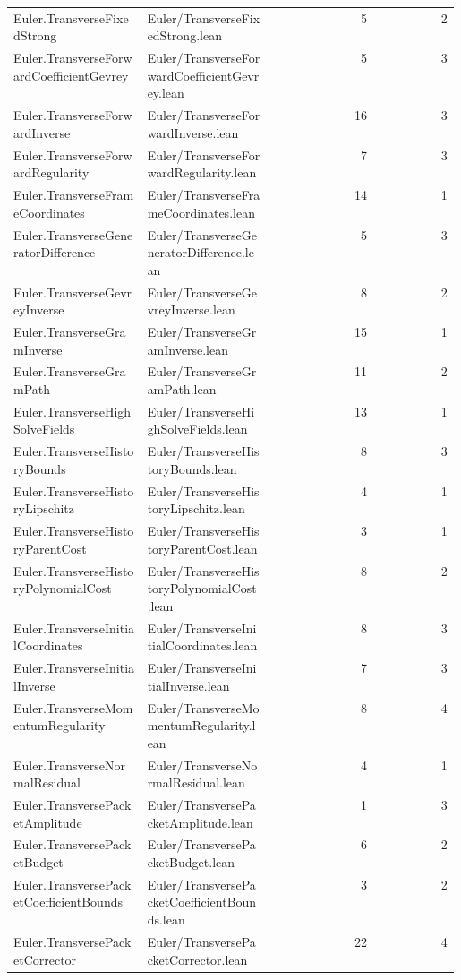 \begin{longtable}{p{0.30\linewidth}p{0.28\linewidth}rr}
Euler.TransverseFixedStrong & Euler/TransverseFixedStrong.lean & 5 & 2\\
Euler.TransverseForwardCoefficientGevrey & Euler/TransverseForwardCoefficientGevrey.lean & 5 & 3\\
Euler.TransverseForwardInverse & Euler/TransverseForwardInverse.lean & 16 & 3\\
Euler.TransverseForwardRegularity & Euler/TransverseForwardRegularity.lean & 7 & 3\\
Euler.TransverseFrameCoordinates & Euler/TransverseFrameCoordinates.lean & 14 & 1\\
Euler.TransverseGeneratorDifference & Euler/TransverseGeneratorDifference.lean & 5 & 3\\
Euler.TransverseGevreyInverse & Euler/TransverseGevreyInverse.lean & 8 & 2\\
Euler.TransverseGramInverse & Euler/TransverseGramInverse.lean & 15 & 1\\
Euler.TransverseGramPath & Euler/TransverseGramPath.lean & 11 & 2\\
Euler.TransverseHighSolveFields & Euler/TransverseHighSolveFields.lean & 13 & 1\\
Euler.TransverseHistoryBounds & Euler/TransverseHistoryBounds.lean & 8 & 3\\
Euler.TransverseHistoryLipschitz & Euler/TransverseHistoryLipschitz.lean & 4 & 1\\
Euler.TransverseHistoryParentCost & Euler/TransverseHistoryParentCost.lean & 3 & 1\\
Euler.TransverseHistoryPolynomialCost & Euler/TransverseHistoryPolynomialCost.lean & 8 & 2\\
Euler.TransverseInitialCoordinates & Euler/TransverseInitialCoordinates.lean & 8 & 3\\
Euler.TransverseInitialInverse & Euler/TransverseInitialInverse.lean & 7 & 3\\
Euler.TransverseMomentumRegularity & Euler/TransverseMomentumRegularity.lean & 8 & 4\\
Euler.TransverseNormalResidual & Euler/TransverseNormalResidual.lean & 4 & 1\\
Euler.TransversePacketAmplitude & Euler/TransversePacketAmplitude.lean & 1 & 3\\
Euler.TransversePacketBudget & Euler/TransversePacketBudget.lean & 6 & 2\\
Euler.TransversePacketCoefficientBounds & Euler/TransversePacketCoefficientBounds.lean & 3 & 2\\
Euler.TransversePacketCorrector & Euler/TransversePacketCorrector.lean & 22 & 4\\

\end{longtable}
